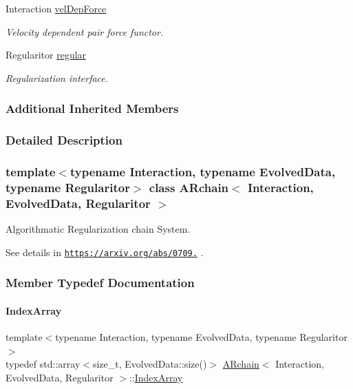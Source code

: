 \begin{DoxyCompactItemize}
Interaction \mbox{\hyperlink{class_a_rchain_a5ad11cefbdb69a58225b799b36dd9eee}{vel\+Dep\+Force}}
\begin{DoxyCompactList}\small\item\em Velocity dependent pair force functor. \end{DoxyCompactList}\item 
Regularitor \mbox{\hyperlink{class_a_rchain_a4dd20aa56d6a6403260ad3ced2987eb0}{regular}}
\begin{DoxyCompactList}\small\item\em Regularization interface. \end{DoxyCompactList}\end{DoxyCompactItemize}
\subsubsection*{Additional Inherited Members}


\subsubsection{Detailed Description}
\subsubsection*{template$<$typename Interaction, typename Evolved\+Data, typename Regularitor$>$\newline
class A\+Rchain$<$ Interaction, Evolved\+Data, Regularitor $>$}

Algorithmatic Regularization chain System. 

See details in \href{https://arxiv.org/abs/0709.3367}{\tt https\+://arxiv.\+org/abs/0709.} . 

\subsubsection{Member Typedef Documentation}
\mbox{\label{class_a_rchain_aae40d4b5881eecfc960814f9e368215d}} 
\paragraph{\texorpdfstring{Index\+Array}{IndexArray}}
{\footnotesize\ttfamily template$<$typename Interaction, typename Evolved\+Data, typename Regularitor$>$ \\
typedef std\+::array$<$size\+\_\+t, Evolved\+Data\+::size()$>$ \mbox{\hyperlink{class_a_rchain}{A\+Rchain}}$<$ Interaction, Evolved\+Data, Regularitor $>$\+::\mbox{\hyperlink{class_a_rchain_aae40d4b5881eecfc960814f9e368215d}{Index\+Array}}}

